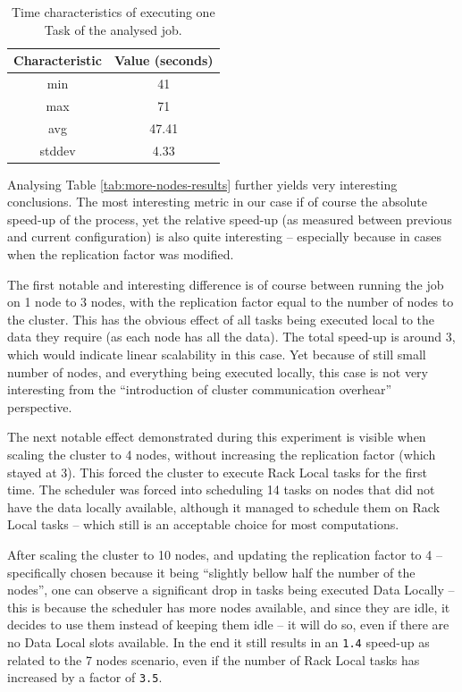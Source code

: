 \begin{table}[bth!]
  \centering
  \begin{tabular}{|c|c|}
  \hline
    \textbf{Characteristic} & \textbf{Value (seconds)} \\ \hline
    min                     & 41     \\ \hline
    max                     & 71     \\ \hline
    avg                 	    & 47.41  \\ \hline
    stddev                  & 4.33   \\ \hline
  \end{tabular}
  \caption{Time characteristics of executing one Task of the analysed job.}
  \label{tab:time-task}
\end{table}

Analysing Table \ref{tab:more-nodes-results} further yields very interesting conclusions. The most interesting metric in our case if of course the absolute speed-up of the process, yet the relative speed-up (as measured between previous and current configuration) is also quite interesting -- especially because in cases when the replication factor was modified.

The first notable and interesting difference is of course between running the job on 1 node to 3 nodes, with the replication factor equal to the number of nodes to the cluster. This has the obvious effect of all tasks being executed local to the data they require (as each node has all the data). The total speed-up is around 3, which would indicate linear scalability in this case. Yet because of still small number of nodes, and everything being executed locally, this case is not very interesting from the ``introduction of cluster communication overhear'' perspective.

The next notable effect demonstrated during this experiment is visible when scaling the cluster to 4 nodes, without increasing the replication factor (which stayed at 3). This forced the cluster to execute Rack Local tasks for the first time. The scheduler was forced into scheduling 14 tasks on nodes that did not have the data locally available, although it managed to schedule them on Rack Local tasks -- which still is an acceptable choice for most computations.

After scaling the cluster to 10 nodes, and updating the replication factor to 4 -- specifically chosen because it being ``slightly bellow half the number of the nodes'', one can observe a significant drop in tasks being executed Data Locally -- this is because the scheduler has more nodes available, and since they are idle, it decides to use them instead of keeping them idle -- it will do so, even if there are no Data Local slots available. In the end it still results in an \verb|1.4| speed-up as related to the 7 nodes scenario, even if the number of Rack Local tasks has increased by a factor of \verb|3.5|.


